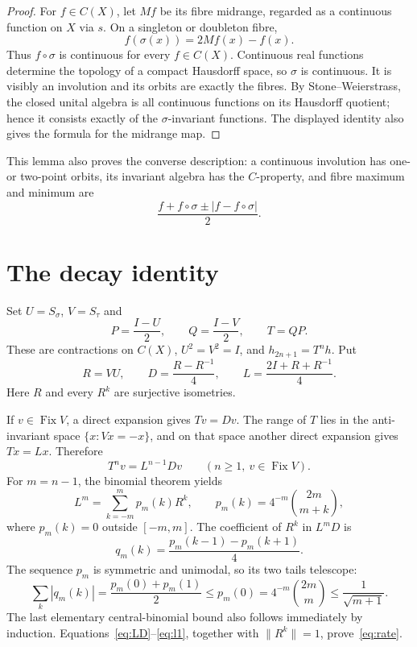 \documentclass[11pt]{article}
\theoremstyle{remark}
\newcommand{\C}{C(X)}
\newcommand{\Fix}{\operatorname{Fix}}
\begin{document}
\begin{proof}
For $f\in\C$, let $Mf$ be its fibre midrange, regarded as a continuous
function on $X$ via $s$.  On a singleton or doubleton fibre,
\[
 f(\sigma(x))=2Mf(x)-f(x).
\]
Thus $f\circ\sigma$ is continuous for every $f\in\C$.  Continuous real
functions determine the topology of a compact Hausdorff space, so $\sigma$
is continuous.  It is visibly an involution and its orbits are exactly the
fibres.  By Stone--Weierstrass, the closed unital algebra is all continuous
functions on its Hausdorff quotient; hence it consists exactly of the
$\sigma$-invariant functions.  The displayed identity also gives the
formula for the midrange map.
\end{proof}

This lemma also proves the converse description: a continuous involution
has one- or two-point orbits, its invariant algebra has the $C$-property,
and fibre maximum and minimum are
\[
 \frac{f+f\circ\sigma\pm|f-f\circ\sigma|}{2}.
\]

\section{The decay identity}

Set $U=S_\sigma$, $V=S_\tau$ and
\[
 P=\frac{I-U}{2},\qquad Q=\frac{I-V}{2},\qquad T=QP.
\]
These are contractions on $\C$, $U^2=V^2=I$, and
$h_{2n+1}=T^nh$.  Put
\[
 R=VU,\qquad D=\frac{R-R^{-1}}4,
 \qquad L=\frac{2I+R+R^{-1}}4.
\]
Here $R$ and every $R^k$ are surjective isometries.

If $v\in\Fix V$, a direct expansion gives $Tv=Dv$.  The range of $T$ lies
in the anti-invariant space $\{x:Vx=-x\}$, and on that space another direct
expansion gives $Tx=Lx$.  Therefore
\begin{equation}\label{eq:LD}
 T^nv=L^{n-1}Dv\qquad(n\ge1,\ v\in\Fix V).
\end{equation}
For $m=n-1$, the binomial theorem yields
\[
 L^m=\sum_{k=-m}^{m}p_m(k)R^k,
 \qquad
 p_m(k)=4^{-m}\binom{2m}{m+k},
\]
where $p_m(k)=0$ outside $[-m,m]$.  The coefficient of $R^k$ in $L^mD$ is
\[
 q_m(k)=\frac{p_m(k-1)-p_m(k+1)}4.
\]
The sequence $p_m$ is symmetric and unimodal, so its two tails telescope:
\begin{equation}\label{eq:l1}
 \sum_k|q_m(k)|
 =\frac{p_m(0)+p_m(1)}2
 \le p_m(0)
 =4^{-m}\binom{2m}{m}
 \le\frac1{\sqrt{m+1}}.
\end{equation}
The last elementary central-binomial bound also follows immediately by
induction.  Equations~\eqref{eq:LD}--\eqref{eq:l1}, together with
$\|R^k\|=1$, prove~\eqref{eq:rate}.
\end{document}

